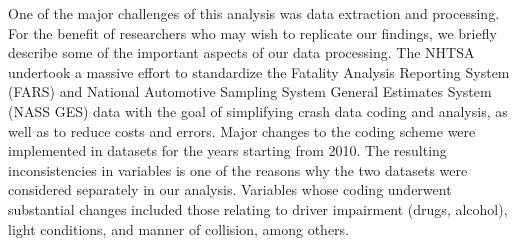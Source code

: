 
One of the major challenges of this analysis was data extraction and processing. For the benefit of researchers who may wish to replicate our findings, we briefly describe some of the important aspects of our data processing. The NHTSA undertook a massive effort to standardize the Fatality Analysis Reporting System (FARS) and National Automotive Sampling System General Estimates System (NASS GES) data with the goal of simplifying crash data coding and analysis, as well as to reduce costs and errors. Major changes to the coding scheme were implemented in datasets for the years starting from 2010. The resulting inconsistencies in variables is one of the reasons why the two datasets were considered separately in our analysis. Variables whose coding underwent substantial changes included those relating to driver impairment (drugs, alcohol), light conditions, and manner of collision, among others.

